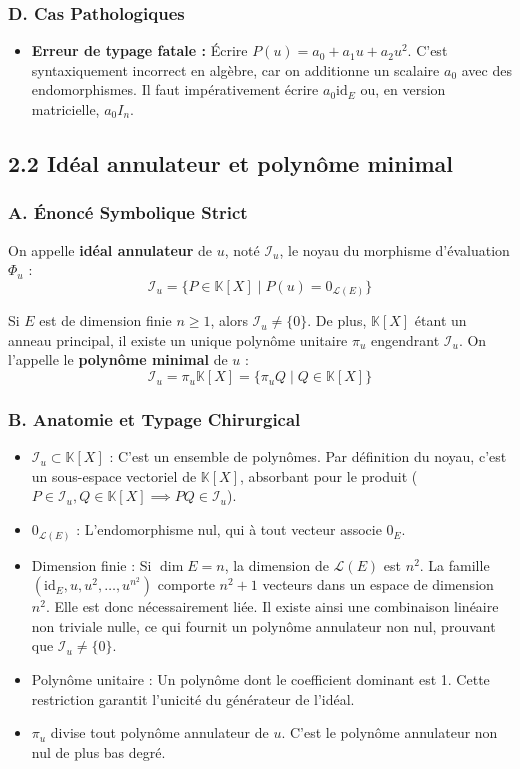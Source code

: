 \documentclass[11pt,a4paper]{article}
\begin{document}
\subsubsection{D. Cas Pathologiques}
\begin{itemize}
\item \textbf{Erreur de typage fatale :} Écrire $P(u) = a_0 + a_1 u + a_2 u^2$. C'est syntaxiquement incorrect en algèbre, car on additionne un scalaire $a_0$ avec des endomorphismes. Il faut impérativement écrire $a_0 \text{id}_E$ ou, en version matricielle, $a_0 I_n$.
\end{itemize}

\subsection{2.2 Idéal annulateur et polynôme minimal}

\subsubsection{A. Énoncé Symbolique Strict}
On appelle \textbf{idéal annulateur} de $u$, noté $\mathcal{I}_u$, le noyau du morphisme d'évaluation $\Phi_u$ :
$$\mathcal{I}_u = \{ P \in \mathbb{K}[X] \mid P(u) = 0_{\mathcal{L}(E)} \}$$

Si $E$ est de dimension finie $n \ge 1$, alors $\mathcal{I}_u \neq \{0\}$. De plus, $\mathbb{K}[X]$ étant un anneau principal, il existe un unique polynôme unitaire $\pi_u$ engendrant $\mathcal{I}_u$. On l'appelle le \textbf{polynôme minimal} de $u$ :
$$\mathcal{I}_u = \pi_u \mathbb{K}[X] = \{ \pi_u Q \mid Q \in \mathbb{K}[X] \}$$

\subsubsection{B. Anatomie et Typage Chirurgical}
\begin{itemize}
\item $\mathcal{I}_u \subset \mathbb{K}[X]$ : C'est un ensemble de polynômes. Par définition du noyau, c'est un sous-espace vectoriel de $\mathbb{K}[X]$, absorbant pour le produit ($P \in \mathcal{I}_u, Q \in \mathbb{K}[X] \implies PQ \in \mathcal{I}_u$).
\item $0_{\mathcal{L}(E)}$ : L'endomorphisme nul, qui à tout vecteur associe $0_E$.
\item Dimension finie : Si $\dim E = n$, la dimension de $\mathcal{L}(E)$ est $n^2$. La famille $(\text{id}_E, u, u^2, \dots, u^{n^2})$ comporte $n^2 + 1$ vecteurs dans un espace de dimension $n^2$. Elle est donc nécessairement liée. Il existe ainsi une combinaison linéaire non triviale nulle, ce qui fournit un polynôme annulateur non nul, prouvant que $\mathcal{I}_u \neq \{0\}$.
\item Polynôme unitaire : Un polynôme dont le coefficient dominant est 1. Cette restriction garantit l'unicité du générateur de l'idéal.
\item $\pi_u$ divise tout polynôme annulateur de $u$. C'est le polynôme annulateur non nul de plus bas degré.
\end{itemize}
\end{document}
